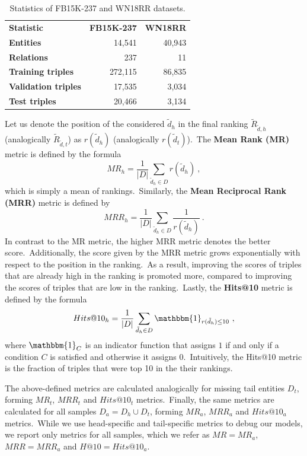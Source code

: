 \documentclass[longabstract, english, mgr]{iithesis}
\theoremstyle{default_theorem_style}\newtheorem{theorem}{Theorem}
\theoremstyle{default_theorem_style}\newtheorem{definition}{Definition}
\begin{document}
\begin{table}[!t]
\centering
\def\arraystretch{1.1}
\begin{tabular}{| l | r | r |}
 \hline
 \textbf{Statistic} & \textbf{FB15K-237} & \textbf{WN18RR} \\ [0.5ex]
 \Xhline{4\arrayrulewidth}
 \textbf{Entities} & 14,541 & 40,943 \\
 \hline
 \textbf{Relations} & 237 & 11 \\
 \hline
 \textbf{Training triples} & 272,115 & 86,835 \\
 \hline
 \textbf{Validation triples} & 17,535 & 3,034 \\
 \hline
 \textbf{Test triples} & 20,466 & 3,134 \\
 \hline
\end{tabular}
\caption{Statistics of FB15K-237 and WN18RR datasets.}
\label{tab:datasets}
\end{table}

\noindent Let us denote the position of the considered $\tilde{d}_h$ in the final ranking
$\tilde{R}_{\tilde{d}, h}$ (analogically $\tilde{R}_{\tilde{d}, t}$) as $r(\tilde{d}_h)$
(analogically $r(\tilde{d}_t)$).\ The \textbf{Mean Rank (MR)} metric is defined by the formula
$$
MR_h = \frac{1}{|D|} \sum_{\tilde{d}_h \in D} r(\tilde{d}_h)\ ,
$$
which is simply a mean of rankings.\ Similarly, the \textbf{Mean Reciprocal Rank (MRR)} metric is defined by
$$
MRR_h = \frac{1}{|D|} \sum_{\tilde{d}_h \in D} \frac{1}{r(\tilde{d}_h)}\ .
$$
In contrast to the MR metric, the higher MRR metric denotes the better score.\ Additionally, the score given by the
MRR metric grows exponentially with respect to the position in the ranking.\ As a result, improving the scores of
triples that are already high in the ranking is promoted more, compared to improving the scores of triples that are
low in the ranking.\ Lastly, the \textbf{Hits@10} metric is defined by the formula
$$
Hits@10_h = \frac{1}{|D|} \sum_{\tilde{d}_h \in D} \mathbbm{1}_{r(\tilde{d}_h) \leq 10}\ ,
$$
where $\mathbbm{1}_C$ is an indicator function that assigns $1$ if and only if a condition $C$ is satisfied and
otherwise it assigns $0$.\ Intuitively, the Hits@10 metric is the fraction of triples that were top 10 in the their
rankings.\newline

\noindent The above-defined metrics are calculated analogically for missing tail entities $D_t$, forming $MR_t$, $MRR_t$
and $Hits@10_t$ metrics.\ Finally, the same metrics are calculated for all samples $D_a = D_h \cup D_t$, forming $MR_a$,
$MRR_a$ and $Hits@10_a$ metrics.\ While we use head-specific and tail-specific metrics to debug our models, we report
only metrics for all samples, which we refer as $MR = MR_a$, $MRR = MRR_a$ and $H@10 = Hits@10_a$.\newline
\end{document}
